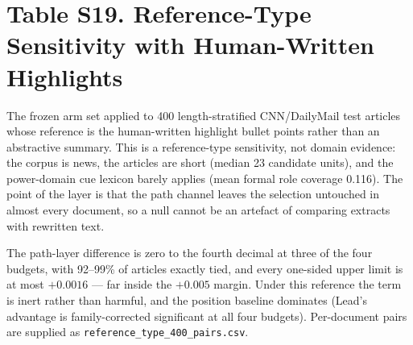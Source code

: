 \documentclass[11pt]{article}
\begin{document}
\section*{Table S19. Reference-Type Sensitivity with Human-Written Highlights}

The frozen arm set applied to 400 length-stratified CNN/DailyMail test articles whose reference is the human-written highlight bullet points rather than an abstractive summary. This is a reference-type sensitivity, not domain evidence: the corpus is news, the articles are short (median 23 candidate units), and the power-domain cue lexicon barely applies (mean formal role coverage 0.116). The point of the layer is that the path channel leaves the selection untouched in almost every document, so a null cannot be an artefact of comparing extracts with rewritten text.

\begin{center}
\small
{}
\end{center}

The path-layer difference is zero to the fourth decimal at three of the four budgets, with 92--99\% of articles exactly tied, and every one-sided upper limit is at most $+0.0016$ --- far inside the $+0.005$ margin. Under this reference the term is inert rather than harmful, and the position baseline dominates (Lead's advantage is family-corrected significant at all four budgets). Per-document pairs are supplied as \nolinkurl{reference\_type\_400\_pairs.csv}.
\end{document}
